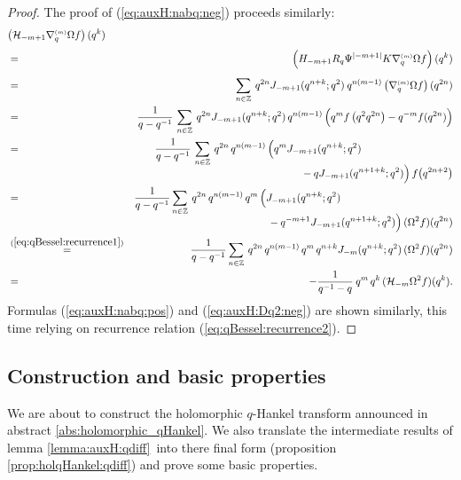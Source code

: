 \begin{proof}
The proof of (\ref{eq:auxH:nabq:neg}) proceeds similarly:
\begin{eqnarray*}
\lefteqn{\left(\auxH{-m+1} \nabq{m} \Omega f\right)(q^k)}
\\&=&\vertXL
  \left(H_{-m+1} R_q \Psi^{|-m+1|} K \nabq{m} \Omega f\right)(q^k)
\\&=&\vertXL
  \sum_{n\in \ZZ} \: q^{2n} \J{-m+1}{q^{n+k}}\:
             q^{n(m-1)} \left(\nabq{m} \Omega f\right)(q^{2n})
\\&=&
    \frac{1}{q-q^{-1}}\, \sum_{n\in \ZZ} \: q^{2n} \J{-m+1}{q^{n+k}}\, q^{n(m-1)}
           \left( q^m f\left(q^2 q^{2n}\right) -  q^{-m} f(q^{2n})\vertL \right)
\\&=&
    \frac{1}{q-q^{-1}}\, \sum_{n\in \ZZ} \: q^{2n} \, q^{n(m-1)}
        \left(\vertL  q^m  \J{-m+1}{q^{n+k}} \right.
  \hspace{-6em}
  \raisebox{-5.5ex}{$ \displaystyle
    \left. -\: q \J{-m+1}{q^{n+1+k}}\vertL\right) f\!\left(q^{2n+2}\right)
  $}
\\&=&
    \frac{1}{q-q^{-1}} \sum_{n\in \ZZ} \: q^{2n} \, q^{n(m-1)}\, q^m
         \left(\vertL  \J{-m+1}{q^{n+k}}
\right.
  \hspace{-7.2em}
  \raisebox{-5.5ex}{$ \displaystyle
    \left. -\:  q^{-m+1} \J{-m+1}{q^{n+1+k}}\vertL \right)
         (\Omega^2 f)(q^{2n})
  $}
\\&\stackrel{(\ref{eq:qBessel:recurrence1})}{=}&
    \frac{1}{q-q^{-1}}  \sum_{n\in \ZZ} \: q^{2n} \, q^{n(m-1)} \,
          q^m \, q^{n+k}  \J{-m}{q^{n+k}} \, (\Omega^2 f)(q^{2n})
\\&=&
    -\frac{1}{q^{-1}-q}\: q^m \, q^k \, (\auxH{-m} \Omega^2 f)(q^k).
\end{eqnarray*}
Formulas (\ref{eq:auxH:nabq:pos}) and (\ref{eq:auxH:Dq2:neg}) are shown
similarly, this time relying on recurrence relation (\ref{eq:qBessel:recurrence2}).
\end{proof}




\subsection{Construction and basic properties}

We are about to construct the holomorphic $q$-Hankel transform
announced in abstract \ref{abs:holomorphic_qHankel}\@.
We also translate the intermediate results of lemma \ref{lemma:auxH:qdiff}\
into there final form (proposition \ref{prop:holqHankel:qdiff})
and prove some basic properties.



